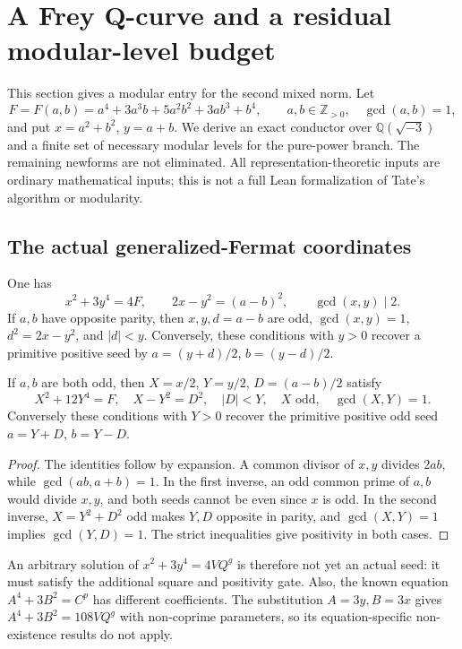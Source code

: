 \section{A Frey Q-curve and a residual modular-level budget}
\label{fm-section}

This section gives a modular entry for the second mixed norm. Let
\[
 F=F(a,b)=a^4+3a^3b+5a^2b^2+3ab^3+b^4,
 \qquad a,b\in\mathbb Z_{>0},\quad\gcd(a,b)=1,
\]
and put $x=a^2+b^2$, $y=a+b$. We derive an exact conductor over
$\mathbb Q(\sqrt{-3})$ and a finite set of necessary modular levels for
the pure-power branch. The remaining newforms are not eliminated.
All representation-theoretic inputs are ordinary mathematical inputs;
this is not a full Lean formalization of Tate's algorithm or modularity.

\subsection{The actual generalized-Fermat coordinates}

\begin{lemma}\label{fm-square-gate}
One has
\begin{equation}\label{fm-coordinates}
 x^2+3y^4=4F,\qquad 2x-y^2=(a-b)^2,\qquad\gcd(x,y)\mid2.
\end{equation}
If $a,b$ have opposite parity, then $x,y,d=a-b$ are odd,
$\gcd(x,y)=1$, $d^2=2x-y^2$, and $|d|<y$. Conversely, these conditions
with $y>0$ recover a primitive positive seed by
$a=(y+d)/2$, $b=(y-d)/2$.

If $a,b$ are both odd, then
$X=x/2$, $Y=y/2$, $D=(a-b)/2$ satisfy
\begin{equation}\label{fm-odd-chart}
 X^2+12Y^4=F,\quad X-Y^2=D^2,\quad |D|<Y,
 \quad X\text{ odd},\quad\gcd(X,Y)=1.
\end{equation}
Conversely these conditions with $Y>0$ recover the primitive positive
odd seed $a=Y+D$, $b=Y-D$.
\end{lemma}
\begin{proof}
The identities follow by expansion. A common divisor of $x,y$ divides
$2ab$, while $\gcd(ab,a+b)=1$. In the first inverse, an odd common
prime of $a,b$ would divide $x,y$, and both seeds cannot be even since
$x$ is odd. In the second inverse, $X=Y^2+D^2$ odd makes $Y,D$
opposite in parity, and $\gcd(X,Y)=1$ implies $\gcd(Y,D)=1$.
The strict inequalities give positivity in both cases.
\end{proof}

An arbitrary solution of $x^2+3y^4=4VQ^g$ is therefore not yet an
actual seed: it must satisfy the additional square and positivity gate.
Also, the known equation $A^4+3B^2=C^p$ has different coefficients.
The substitution $A=3y,B=3x$ gives $A^4+3B^2=108VQ^g$ with non-coprime
parameters, so its equation-specific non-existence results do not apply.

